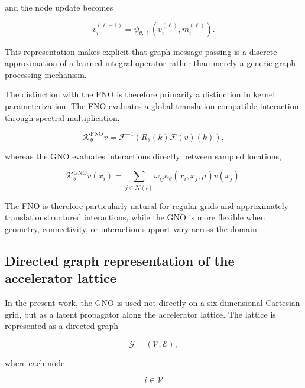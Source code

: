 and the node update becomes

\begin{equation}
\label{eq:110}
v_i^{(\ell+1)}=\psi_{\theta,\ell}(v_i^{(\ell)},m_i^{(\ell)}).
\end{equation}

This representation makes explicit that graph message passing is a discrete approximation of a learned integral operator rather than merely a generic graph-processing mechanism.

The distinction with the FNO is therefore primarily a distinction in kernel parameterization. The FNO evaluates a global translation-compatible interaction through spectral multiplication,

\begin{equation}
\label{eq:111}
\mathcal K_{\theta}^{\mathrm{FNO}}v=\mathcal F^{-1}(R_{\theta}(k)\mathcal F(v)(k)),
\end{equation}

whereas the GNO evaluates interactions directly between sampled locations,

\begin{equation}
\label{eq:112}
\mathcal K_{\theta}^{\mathrm{GNO}}v(x_i)=\sum_{j\in\mathcal N(i)}\omega_{ij}\kappa_{\theta}(x_i,x_j,\mu)v(x_j).
\end{equation}

The FNO is therefore particularly natural for regular grids and approximately translationstructured interactions, while the GNO is more flexible when geometry, connectivity, or interaction support vary across the domain.

\subsection{Directed graph representation of the accelerator lattice}
\label{sec:04_machine_learning_methodology_directed_graph_representation_of_the_accelerator_lattice}

In the present work, the GNO is used not directly on a six-dimensional Cartesian grid, but as a latent propagator along the accelerator lattice. The lattice is represented as a directed graph

\begin{equation}
\label{eq:113}
\mathcal G=(\mathcal V,\mathcal E),
\end{equation}

where each node

\begin{equation}
\label{eq:114}
i\in\mathcal V
\end{equation}

